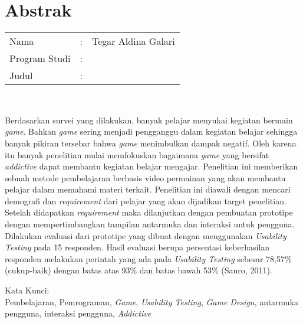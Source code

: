 %
%
%

\chapter*{Abstrak}

\vspace*{0.2cm}

\noindent \begin{tabular}{l l p{10cm}}
	Nama&: & Tegar Aldina Galari \\
	Program Studi&: & \program \\
	Judul&: & \judul \\
\end{tabular} \\ 

\vspace*{0.5cm}

\noindent 
Berdasarkan survei yang dilakukan, banyak pelajar menyukai kegiatan bermain \textit{game}. Bahkan \textit{game} sering menjadi pengganggu dalam kegiatan belajar sehingga banyak pikiran tersebar bahwa \textit{game} menimbulkan dampak negatif. Oleh karena itu banyak penelitian mulai memfokuskan bagaimana \textit{game} yang bersifat \textit{addictive} dapat membantu kegiatan belajar mengajar. Penelitian ini memberikan sebuah metode pembelajaran berbasis video permainan yang akan membantu pelajar dalam memahami materi terkait. Penelitian ini diawali dengan mencari demografi dan \textit{requirement} dari pelajar yang akan dijadikan target penelitian. Setelah didapatkan \textit{requirement} maka dilanjutkan dengan pembuatan prototipe dengan mempertimbangkan tampilan antarmuka dan interaksi untuk pengguna. Dilakukan evaluasi dari prototipe yang dibuat dengan menggunakan \textit{Usability Testing} pada 15 responden. Hasil evaluasi berupa persentasi keberhasilan responden melakukan perintah yang ada pada \textit{Usability Testing} sebesar 78,57\% (cukup-baik) dengan batas atas 93\% dan batas bawah 53\% (Sauro, 2011).

\vspace*{0.2cm}

\noindent Kata Kunci: \\ 
\noindent Pembelajaran, Pemrograman, \textit{Game}, \textit{Usability Testing}, \textit{Game Design}, antarmuka pengguna, interaksi pengguna, \textit{Addictive}\\ 

\newpage